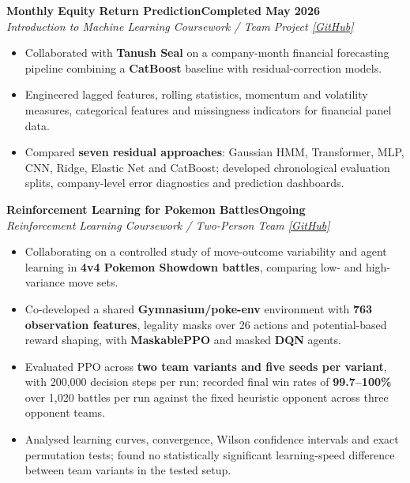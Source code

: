 \documentclass[10pt,a4paper]{article}
\newcommand{\entry}[3]{%
  \noindent\textbf{#1}\hfill\textbf{#3}\\[-1pt]
  \textit{#2}\par
}
\newenvironment{cvitems}{%
  \begin{itemize}[leftmargin=1.15em,label=\textbullet,itemsep=2.5pt,topsep=3pt,parsep=0pt,partopsep=0pt]
}{\end{itemize}}
\begin{document}
\entry{Monthly Equity Return Prediction}{Introduction to Machine Learning Coursework / Team Project \quad \href{https://github.com/MushuRam01/IML_project}{[GitHub]}}{Completed May 2026}
\begin{cvitems}
  \item Collaborated with \textbf{Tanush Seal} on a company-month financial forecasting pipeline combining a \textbf{CatBoost} baseline with residual-correction models.
  \item Engineered lagged features, rolling statistics, momentum and volatility measures, categorical features and missingness indicators for financial panel data.
  \item Compared \textbf{seven residual approaches}: Gaussian HMM, Transformer, MLP, CNN, Ridge, Elastic Net and CatBoost; developed chronological evaluation splits, company-level error diagnostics and prediction dashboards.
\end{cvitems}

\entry{Reinforcement Learning for Pokemon Battles}{Reinforcement Learning Coursework / Two-Person Team \quad \href{https://github.com/Kabir1607/RL_MidSem_Kabir_Aarush}{[GitHub]}}{Ongoing}
\begin{cvitems}
  \item Collaborating on a controlled study of move-outcome variability and agent learning in \textbf{4v4 Pokemon Showdown battles}, comparing low- and high-variance move sets.
  \item Co-developed a shared \textbf{Gymnasium/poke-env} environment with \textbf{763 observation features}, legality masks over 26 actions and potential-based reward shaping, with \textbf{MaskablePPO} and masked \textbf{DQN} agents.
  \item Evaluated PPO across \textbf{two team variants and five seeds per variant}, with 200,000 decision steps per run; recorded final win rates of \textbf{99.7--100\%} over 1,020 battles per run against the fixed heuristic opponent across three opponent teams.
  \item Analysed learning curves, convergence, Wilson confidence intervals and exact permutation tests; found no statistically significant learning-speed difference between team variants in the tested setup.
\end{cvitems}
\end{document}
